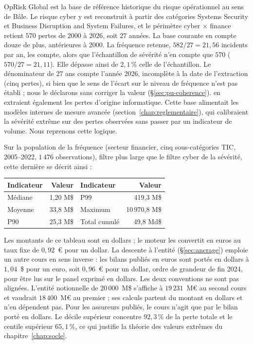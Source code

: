OpRisk Global est la base de référence historique du risque opérationnel au sens de Bâle. Le risque cyber y est reconstruit à
partir des catégories \og Systems Security\fg{} et \og Business Disruption and System Failures\fg{}, et
le périmètre cyber $\times$ finance retient $570$ pertes de 2000 à 2026, soit $27$ années. La base courante en compte douze de plus, antérieures à 2000. La fréquence retenue, $582/27 = 21{,}56$ incidents par an, les compte, alors que l'échantillon de sévérité n'en compte que $570$ ($570/27 = 21{,}11$). Elle dépasse ainsi de $2{,}1\,\%$ celle de l'échantillon. Le dénominateur de $27$ ans compte l'année 2026, incomplète à la date de l'extraction (cinq pertes), si bien que le sens de l'écart sur le niveau de fréquence n'est pas établi ; nous le déclarons sans corriger la valeur (\S\ref{sec:pu-coherence}). \citet{elingwirfs2019}
en extraient également les pertes d'origine informatique. Cette base alimentait les modèles internes de
mesure avancée (section~\ref{chap:reglementaire}), qui calibraient la sévérité extrême sur des pertes
observées sans passer par un indicateur de volume. Nous reprenons cette logique.

Sur la population de la fréquence (secteur financier, cinq sous-catégories TIC, 2005--2022, $1\,476$
observations), filtre plus large que le filtre cyber de la sévérité, cette dernière se décrit ainsi :
\begin{center}
\renewcommand{\arraystretch}{1.3}
\begin{tabular}{l r l r}
\toprule
\rowcolor{lightblue}
\textbf{Indicateur} & \textbf{Valeur} & \textbf{Indicateur} & \textbf{Valeur} \\
\midrule
Médiane & 1{,}20 M\$ & P99 & 419{,}3 M\$ \\
Moyenne & 33{,}8 M\$ & Maximum & 10\,970{,}8 M\$ \\
P90 & 25{,}3 M\$ & Total cumulé & 49{,}8 Md\$ \\
\bottomrule
\end{tabular}
\end{center}
Les montants de ce tableau sont en dollars ; le moteur les convertit en euros au taux fixe de $0{,}92$~\euro{} pour un dollar. La descente à l'entité (\S\ref{sec:ancrage}) emploie un autre cours en sens inverse : les bilans publiés en euros sont portés en dollars à $1{,}04$~\$ pour un euro, soit $0{,}96$~\euro{} pour un dollar, ordre de grandeur de fin 2024, pour être lus sur le panel exprimé en dollars. Les deux conventions ne sont pas alignées. L'entité notionnelle de $20\,000$~M\$ s'affiche à $19\,231$~M\euro{} au second cours et vaudrait $18\,400$~M\euro{} au premier ; ses calculs partent du montant en dollars et n'en dépendent pas. Pour les assureurs publiés, le cours n'agit que par le bilan porté en dollars. Le décile supérieur concentre $92{,}3\,\%$ de la perte totale et le centile supérieur $65{,}1\,\%$,
ce qui justifie la théorie des valeurs extrêmes du chapitre~\ref{chap:socle}.

